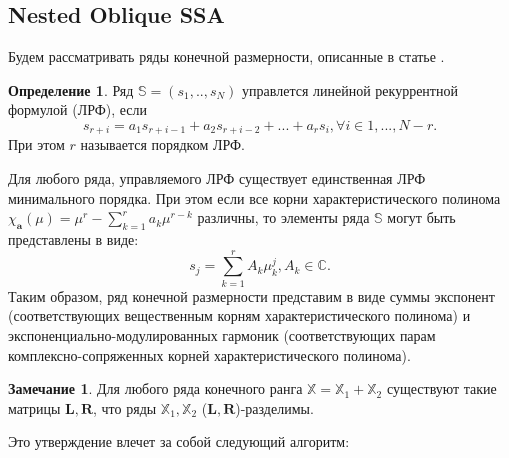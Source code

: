 \documentclass[specialist, substylefile = spbureport.rtx, subf,href,colorlinks=true, 12pt]{disser}
\theoremstyle{definition}
\newtheorem{definition}{Определение}
\newtheorem{remark}{Замечание}
\begin{document}
\subsection{Nested Oblique SSA}
Будем рассматривать ряды конечной размерности, описанные в статье \cite{Shlemov}.
    \begin{definition}
        Ряд $\mathbb{S} = (s_1, .., s_N)$ управлется линейной рекуррентной формулой (ЛРФ), если
        \begin{equation*}
            s_{r+i} = a_1s_{r+i - 1} + a_2s_{r+i - 2} + . . . + a_rs_i
, \forall i \in 1, . . . , N - r.
        \end{equation*}
        При этом $r$ называется порядком ЛРФ.
    \end{definition}
    Для любого ряда, управляемого ЛРФ существует единственная ЛРФ минимального порядка.
    При этом если все корни характеристического полинома $\chi_{\mathbf{a}} (\mu ) = \mu^r - \sum^r_{k=1} a_k\mu^{r - k}$ различны, то элементы ряда $\mathbb{S}$ могут быть представлены в виде:
    \begin{equation*}
        s_j =\sum^r_{k=1} A_k\mu^j_k
, A_k \in \mathbb{C}.
    \end{equation*}
    Таким образом, ряд конечной размерности представим в виде
суммы экспонент (соответствующих вещественным корням характеристического полинома) и
экспоненциально-модулированных гармоник (соответствующих парам
комплексно-сопряженных корней характеристического полинома).

\begin{remark}
 Для любого ряда конечного ранга $\mathbb{X} = \mathbb{X}_1 + \mathbb{X}_2$ существуют такие матрицы $\mathbf{L}, \mathbf{R}$, что ряды $\mathbb{X}_1, \mathbb{X}_2$ ($\mathbf{L}, \mathbf{R}$)-разделимы.
\end{remark}

Это утверждение влечет за собой следующий алгоритм:
\end{document}
